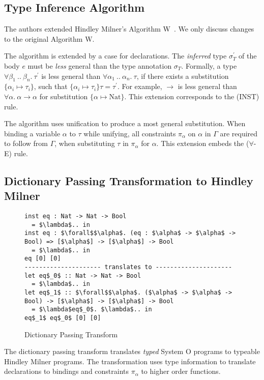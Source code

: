 \documentclass[runningheads]{llncs}
\newcommand{\snip}[1]{\footnotesize{\ttfamily{#1}}}
\begin{document}
\subsection{Type Inference Algorithm}
The authors extended Hindley Milner's Algorithm W~\cite{hm78}. We only discuss changes to the original Algorithm W.

The algorithm is extended by a case for \snip{inst} declarations. The \emph{inferred} type $\sigma_T^\prime$ of the body $e$ must be \emph{less} general than the type annotation $\sigma_T$. 
Formally, a type $\forall \beta_1 \ .. \ \beta_n. \ \tau^\prime$ is less general than $\forall \alpha_1 \ .. \ \alpha_n. \ \tau$, if there exists a substitution $\{\alpha_i \mapsto \tau_i\}$, such that $\{\alpha_i \mapsto \tau_i\}\tau = \tau^\prime$.  
For example, \snip{Nat} $\rightarrow$ \snip{Nat} is less general than $\forall \alpha. \ \alpha \rightarrow \alpha$ for substitution $\{\alpha \mapsto \text{Nat}\}$. This extension corresponds to the (INST) rule.

The algorithm uses unification to produce a most general substitution. 
When binding a variable $\alpha$ to $\tau$ while unifying, all constraints $\pi_\alpha$ on $\alpha$ in $\Gamma$ are required to follow from $\Gamma$, when substituting $\tau$ in $\pi_\alpha$ for $\alpha$. This extension embeds the ($\forall$-E) rule.

\subsection{Dictionary Passing Transformation to Hindley Milner}
\begin{figure}
  \begin{lstlisting}
inst eq : Nat -> Nat -> Bool 
  = $\lambda$.. in                 
inst eq : $\forall$$\alpha$. (eq : $\alpha$ -> $\alpha$ -> Bool) => [$\alpha$] -> [$\alpha$] -> Bool 
  = $\lambda$.. in
eq [0] [0]
--------------------- translates to ---------------------
let eq$_0$ :: Nat -> Nat -> Bool
  = $\lambda$.. in
let eq$_1$ :: $\forall$$\alpha$. ($\alpha$ -> $\alpha$ -> Bool) -> [$\alpha$] -> [$\alpha$] -> Bool     
  = $\lambda$eq$_0$. $\lambda$.. in
eq$_1$ eq$_0$ [0] [0]  
  \end{lstlisting}
  \caption{Dictionary Passing Transform} \label{transform}
\end{figure}
The dictionary passing transform translates \emph{typed} System O programs to typeable Hindley Milner programs. 
The transformation uses type information to translate \snip{inst} declarations to \snip{let} bindings and constraints $\pi_\alpha$ to higher order functions. 
\end{document}
